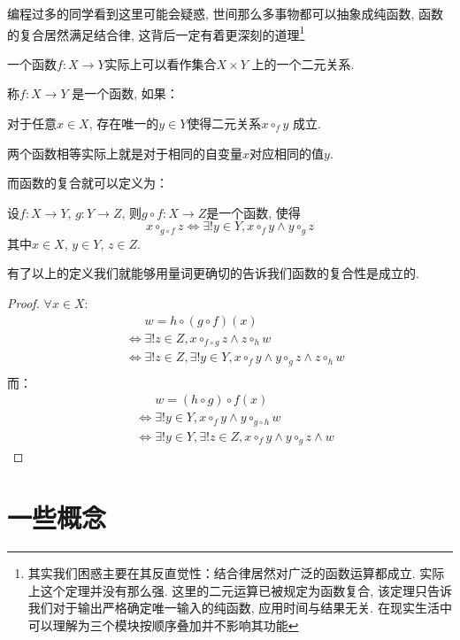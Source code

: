 编程过多的同学看到这里可能会疑惑, 世间那么多事物都可以抽象成纯函数, 函数的复合居然满足结合律,
这背后一定有着更深刻的道理\footnote{其实我们困惑主要在其反直觉性：结合律居然对广泛的函数运算都成立.
    实际上这个定理并没有那么强. 这里的二元运算已被规定为函数复合, 该定理只告诉我们对于输出严格确定唯一输入的纯函数,
应用时间与结果无关. 在现实生活中可以理解为三个模块按顺序叠加并不影响其功能}

一个函数\(f: X \to Y\)实际上可以看作集合\(X \times Y\) 上的一个二元关系.

\begin{definition}
    称\(f: X\to Y\) 是一个函数, 如果：

    对于任意\(x\in X\), 存在唯一的\(y\in Y\)使得二元关系\(x \circ_{f} y\) 成立.
\end{definition}

两个函数相等实际上就是对于相同的自变量\(x\)对应相同的值\(y\).

而函数的复合就可以定义为：
\begin{definition}
    设\(f: X\to Y\), \(g: Y\to Z\), 则\(g\circ f: X \to Z\)是一个函数, 使得
    \[
        x \circ_{g\circ f} z \iff \exists! y \in Y, x
        \circ_{f} y \land y \circ_{g} z
    \]
    其中\(x\in X\), \(y\in Y\), \(z\in Z\).
\end{definition}
有了以上的定义我们就能够用量词更确切的告诉我们函数的复合性是成立的.

\begin{proof}
    \(\forall x \in X\):
    \begin{align*}
        &\mathrel{\phantom{\iff}}w=h \circ(g\circ f)(x) \\
        &\iff \exists! z \in Z, x \circ_{f\circ g} z \land z
        \circ_{h} w\\
        &\iff \exists! z \in Z, \exists! y \in Y, x
        \circ_{f} y \land y \circ_{g} z \land z
        \circ_{h} w\\
    \end{align*}
    而：
    \begin{align*}
        &\mathrel{\phantom{\iff}}w=(h\circ g)\circ f(x) \\
        &\iff \exists! y \in Y, x \circ_{f} y \land y
        \circ_{g \circ h} w\\
        &\iff \exists! y \in Y, \exists! z \in Z, x
        \circ_{f} y \land y
        \circ_{g} z \land w
    \end{align*}
\end{proof}

\section{一些概念}

